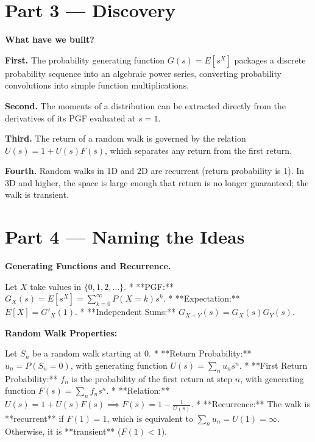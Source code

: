 \documentclass[12pt, a4paper]{article}
\begin{document}
\newpage

\section{Part 3 \texorpdfstring{---}{--} Discovery}

\begin{discoverybox}
\textbf{What have we built?}

\textbf{First.} The probability generating function $G(s) = E[s^X]$ packages a discrete probability sequence into an algebraic power series, converting probability convolutions into simple function multiplications.

\textbf{Second.} The moments of a distribution can be extracted directly from the derivatives of its PGF evaluated at $s = 1$.

\textbf{Third.} The return of a random walk is governed by the relation $U(s) = 1 + U(s)F(s)$, which separates any return from the first return.

\textbf{Fourth.} Random walks in 1D and 2D are recurrent (return probability is 1). In 3D and higher, the space is large enough that return is no longer guaranteed; the walk is transient.
\end{discoverybox}

\newpage

\section{Part 4 \texorpdfstring{---}{--} Naming the Ideas}

\begin{namebox}
\textbf{Generating Functions and Recurrence.}

Let $X$ take values in $\{0, 1, 2, \dots\}$.
* **PGF:** $G_X(s) = E[s^X] = \sum_{k=0}^\infty P(X=k) s^k$.
* **Expectation:** $E[X] = G'_X(1)$.
* **Independent Sums:** $G_{X+Y}(s) = G_X(s) G_Y(s)$.

\medskip
\textbf{Random Walk Properties:}

Let $S_n$ be a random walk starting at 0.
* **Return Probability:** $u_n = P(S_n = 0)$, with generating function $U(s) = \sum_n u_n s^n$.
* **First Return Probability:** $f_n$ is the probability of the first return at step $n$, with generating function $F(s) = \sum_n f_n s^n$.
* **Relation:** $U(s) = 1 + U(s)F(s) \implies F(s) = 1 - \frac{1}{U(s)}$.
* **Recurrence:** The walk is **recurrent** if $F(1) = 1$, which is equivalent to $\sum_n u_n = U(1) = \infty$. Otherwise, it is **transient** ($F(1) < 1$).
\end{namebox}
\end{document}
